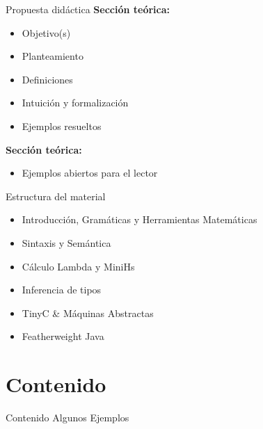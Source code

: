 \documentclass[11pt]{beamer}
\begin{document}
\begin{frame}{Propuesta didáctica}
	\textbf{Sección teórica:}
	\begin{itemize}
		\item{Objetivo(s)} \\
		\item{Planteamiento}\\
		\item{Definiciones}\\
		\item{Intuición y formalización}\\
		\item{Ejemplos resueltos}
	\end{itemize}
	\textbf{Sección teórica:}
	\begin{itemize}
		\item{Ejemplos abiertos para el lector}
	\end{itemize}
\end{frame}



\begin{frame}{Estructura del material}
	\begin{itemize}
		\item{Introducción, Gramáticas y Herramientas Matemáticas} \\
		\item{Sintaxis y Semántica}\\
		\item{Cálculo Lambda y MiniHs}\\
		\item{Inferencia de tipos}\\
		\item{TinyC \& Máquinas Abstractas} \\
		\item{Featherweight Java}
	\end{itemize}
\end{frame}

\section{Contenido}


\begin{frame}{Contenido}
	Algunos Ejemplos
\end{frame}
\end{document}
